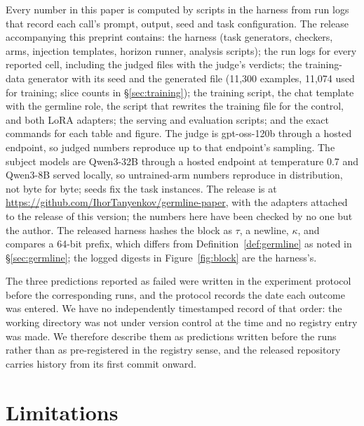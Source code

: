 \documentclass[11pt]{article}
\newcommand{\germ}{\textsf{germline}}
\begin{document}
Every number in this paper is computed by scripts in the harness from run logs that record each call's prompt, output, seed and task configuration. The release accompanying this preprint contains: the harness (task generators, checkers, arms, injection templates, horizon runner, analysis scripts); the run logs for every reported cell, including the judged files with the judge's verdicts; the training-data generator with its seed and the generated file (11,300 examples, 11,074 used for training; slice counts in \S\ref{sec:training}); the training script, the chat template with the \germ{} role, the script that rewrites the training file for the control, and both LoRA adapters; the serving and evaluation scripts; and the exact commands for each table and figure. The judge is gpt-oss-120b through a hosted endpoint, so judged numbers reproduce up to that endpoint's sampling. The subject models are Qwen3-32B through a hosted endpoint at temperature 0.7 and Qwen3-8B served locally, so untrained-arm numbers reproduce in distribution, not byte for byte; seeds fix the task instances. The release is at \url{https://github.com/IhorTanyenkov/germline-paper}, with the adapters attached to the release of this version; the numbers here have been checked by no one but the author. The released harness hashes the block as $\tau$, a newline, $\kappa$, and compares a 64-bit prefix, which differs from Definition~\ref{def:germline} as noted in \S\ref{sec:germline}; the logged digests in Figure~\ref{fig:block} are the harness's.

The three predictions reported as failed were written in the experiment protocol before the corresponding runs, and the protocol records the date each outcome was entered. We have no independently timestamped record of that order: the working directory was not under version control at the time and no registry entry was made. We therefore describe them as predictions written before the runs rather than as pre-registered in the registry sense, and the released repository carries history from its first commit onward.

\section{Limitations}\label{sec:limits}
\end{document}
